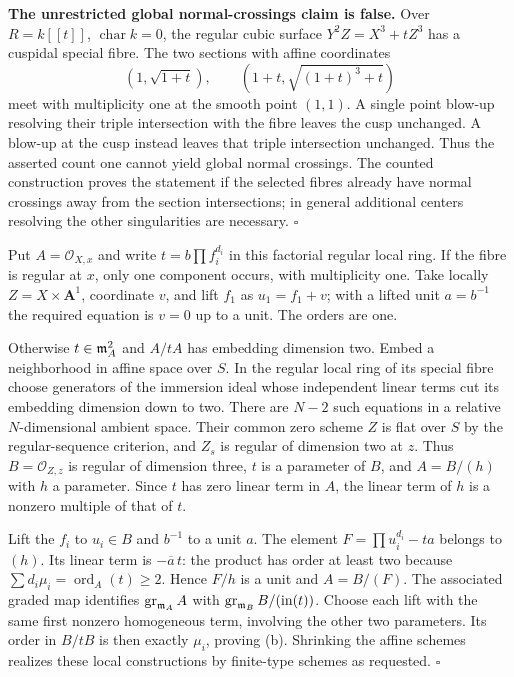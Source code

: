 \documentclass[11pt]{article}
\let\chapterexercise\exercise
\renewcommand{\exercise}[2]{\Needspace{8\baselineskip}\chapterexercise{#1}{#2}}
\begin{document}
\textbf{The unrestricted global normal-crossings claim is false.} Over $R=k[[t]]$, $\operatorname{char}k=0$, the regular cubic surface $Y^2Z=X^3+tZ^3$ has a cuspidal special fibre. The two sections with affine coordinates
\[ (1,\sqrt{1+t}),\qquad(1+t,\sqrt{(1+t)^3+t}) \]
meet with multiplicity one at the smooth point $(1,1)$. A single point blow-up resolving their triple intersection with the fibre leaves the cusp unchanged. A blow-up at the cusp instead leaves that triple intersection unchanged. Thus the asserted count one cannot yield global normal crossings. The counted construction proves the statement if the selected fibres already have normal crossings away from the section intersections; in general additional centers resolving the other singularities are necessary. \hfill$\square$

\pf Put $A=\mathcal O_{X,x}$ and write $t=b\prod f_i^{d_i}$ in this factorial regular local ring. If the fibre is regular at $x$, only one component occurs, with multiplicity one. Take locally $Z=X\times\mathbf A^1$, coordinate $v$, and lift $f_1$ as $u_1=f_1+v$; with a lifted unit $a=b^{-1}$ the required equation is $v=0$ up to a unit. The orders are one.

Otherwise $t\in\mathfrak m_A^2$ and $A/tA$ has embedding dimension two. Embed a neighborhood in affine space over $S$. In the regular local ring of its special fibre choose generators of the immersion ideal whose independent linear terms cut its embedding dimension down to two. There are $N-2$ such equations in a relative $N$-dimensional ambient space. Their common zero scheme $Z$ is flat over $S$ by the regular-sequence criterion, and $Z_s$ is regular of dimension two at $z$. Thus $B=\mathcal O_{Z,z}$ is regular of dimension three, $t$ is a parameter of $B$, and $A=B/(h)$ with $h$ a parameter. Since $t$ has zero linear term in $A$, the linear term of $h$ is a nonzero multiple of that of $t$.

Lift the $f_i$ to $u_i\in B$ and $b^{-1}$ to a unit $a$. The element $F=\prod u_i^{d_i}-ta$ belongs to $(h)$. Its linear term is $-\overline a\,t$: the product has order at least two because $\sum d_i\mu_i=\operatorname{ord}_A(t)\ge2$. Hence $F/h$ is a unit and $A=B/(F)$. The associated graded map identifies $\operatorname{gr}_{\mathfrak m_A}A$ with $\operatorname{gr}_{\mathfrak m_B}B/(\operatorname{in}(t))$. Choose each lift with the same first nonzero homogeneous term, involving the other two parameters. Its order in $B/tB$ is then exactly $\mu_i$, proving (b). Shrinking the affine schemes realizes these local constructions by finite-type schemes as requested. \hfill$\square$
\end{document}
